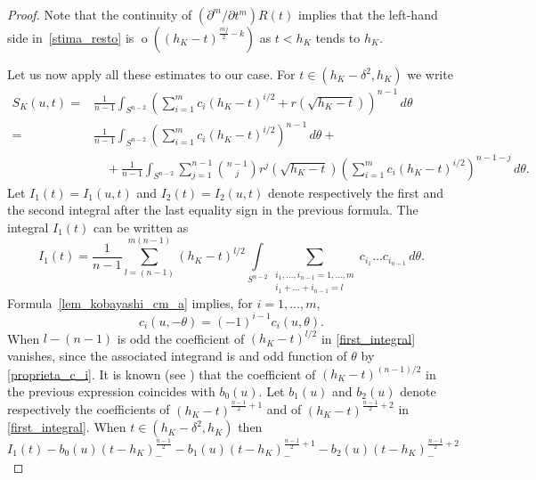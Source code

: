 \documentclass[a4paper]{amsart}
\theoremstyle{definition}
\numberwithin{equation}{section}
\begin{document}
\begin{proof}
Note that the continuity of $({{\partial}}^m/{{\partial}} t^m) R(t)$ implies that the left-hand side in~\eqref{stima_resto} is ${{\operatorname{o}}}\left((h_K-t)^{\frac{m j}2-k}\right)$ as $t<h_K$ tends to $h_K$.

Let us now apply all these estimates to our case. For $t\in(h_K-{{\delta}}^2,h_K)$ we write
\begin{equation*}\label{sviluppo_asintotico_SK}
\begin{split}
S_K(u,t)=& 
\frac1{n-1}\int_{S^{n-2}} \left(\sum_{i=1}^{m}c_i (h_K-t)^{i/2}+r\left(\sqrt{h_K-t}\right)\right)^{n-1}\,d{{\theta}}\\
=&\frac1{n-1}\int_{S^{n-2}} \left(\sum_{i=1}^{m}c_i (h_K-t)^{i/2}\right)^{n-1}\,d{{\theta}}+\\
&\quad+\frac1{n-1}\int_{S^{n-2}}\sum_{j=1}^{n-1}\binom{n-1}{j} r^j\left(\sqrt{h_K-t}\right)\left(\sum_{i=1}^{m}c_i (h_K-t)^{i/2}\right)^{n-1-j}\,d{{\theta}}.
\end{split}\end{equation*}
Let $I_1(t)=I_1(u,t)$ and $I_2(t)=I_2(u,t)$ denote respectively the first and the second integral after the last equality sign in the previous formula.
The integral $I_1(t)$ can be written as 
\begin{equation}\label{first_integral}
I_1(t)= \frac1{n-1}\sum_{l=(n-1)}^{m(n-1)}(h_K-t)^{l/2}\int\limits_{S^{n-2}}\sum_{\substack{i_1,\dots,i_{n-1}=1,\dots,m\\i_1+\dots+i_{n-1}=l}}c_{i_1}\dots c_{i_{n-1}}\,d{{\theta}}.
\end{equation}
 Formula~\eqref{lem_kobayashi_cm_a} implies, for $i=1,\dots,m$,
\begin{equation}\label{proprieta_c_i}
 c_i(u,-{{\theta}})=(-1)^{i-1} c_i(u,{{\theta}}).
\end{equation}
 When $l-(n-1)$ is odd   the coefficient of $(h_K-t)^{l/2}$ in \eqref{first_integral} vanishes, since  the associated integrand is and odd function of ${{\theta}}$ by \eqref{proprieta_c_i}.
 It is known (see \cite{Kob1}) that the coefficient of $(h_K-t)^{(n-1)/2}$ in the previous expression coincides with $b_0(u)$. Let $b_1(u)$ and $b_2(u)$ denote respectively the coefficients of $(h_K-t)^{\frac{n-1}{2}+1}$ and of $(h_K-t)^{\frac{n-1}{2}+2}$ in \eqref{first_integral}.
 When $t\in(h_K-{{\delta}}^2,h_K)$ then
\begin{equation}\label{Iunomenoprimitermini}
 I_1(t)-b_0(u)(t-h_K)_-^\frac{n-1}{2}-b_1(u)(t-h_K)_-^{\frac{n-1}{2}+1}-b_2(u)(t-h_K)_-^{\frac{n-1}{2}+2}
\end{equation}

\end{proof}
\end{document}

